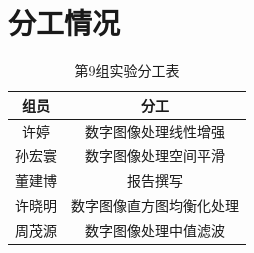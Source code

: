 \documentclass[12pt]{article}
\begin{document}
\section{分工情况}
\begin{table}[htbp]
  \centering
  \caption{第9组实验分工表}
    \begin{tabular}{cc}
    \hline
    组员 & 分工 \\
    \hline
    许婷 & 数字图像处理线性增强 \\
    孙宏寰 & 数字图像处理空间平滑 \\
    董建博 & 报告撰写 \\
    许晓明 & 数字图像直方图均衡化处理 \\
    周茂源  & 数字图像处理中值滤波 \\
    \hline
    \end{tabular}%
  \label{tab:addlabel}%
\end{table}%
\end{document}
